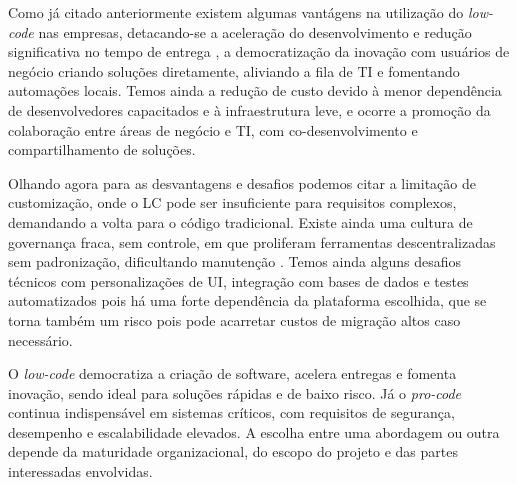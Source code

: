 	Como já citado anteriormente existem algumas vantágens na utilização do \textit{low-code} nas empresas, detacando-se a aceleração do desenvolvimento e redução
	significativa no tempo de entrega \cite{LowCodeExploring}, a democratização da inovação com usuários de negócio criando soluções diretamente, aliviando a fila de TI e fomentando automações locais.
	Temos ainda a redução de custo devido à menor dependência de desenvolvedores capacitados e à infraestrutura leve, e ocorre a promoção da colaboração entre áreas de negócio e TI, com co-desenvolvimento e compartilhamento de soluções.

	Olhando agora para as desvantagens e desafios podemos citar a limitação de customização, onde o LC pode ser insuficiente para requisitos complexos, demandando a volta para o código tradicional. Existe ainda uma cultura de governança
	fraca, sem controle, em que proliferam ferramentas descentralizadas sem padronização, dificultando manutenção \cite{wireCitizenDev}.
	Temos ainda alguns desafios técnicos com personalizações de UI, integração com bases de dados e testes automatizados pois há uma forte dependência
	da plataforma escolhida, que se torna também um risco pois pode acarretar custos de migração altos caso necessário.

	O \textit{low-code} democratiza a criação de software, acelera entregas e fomenta inovação, sendo ideal para soluções rápidas e de baixo risco. Já o \textit{pro-code} continua indispensável em sistemas críticos, com requisitos de segurança, desempenho e escalabilidade elevados. A escolha entre uma abordagem ou outra depende da maturidade organizacional, do escopo do projeto e das partes interessadas envolvidas.

